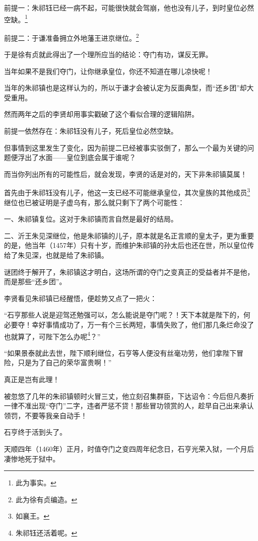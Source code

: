 \begin{multicols}{\theparacolNo}
		前提一：朱祁钰已经一病不起，可能很快就会驾崩，他也没有儿子，到时皇位必然空缺。\footnote{此为事实。}

		前提二：于谦准备拥立外地藩王进京继位。\footnote{此为徐有贞编造。}

		于是徐有贞就此得出了一个理所应当的结论：夺门有功，谋反无罪。

		当年如果不是我们夺门，让你继承皇位，你还不知道在哪儿凉快呢！

		当年的朱祁镇也是这样认为的，所以于谦才会被认定为反面典型，而“还乡团”却大受重用。

		然而两年之后的李贤却用事实戳破了这个看似合理的逻辑陷阱。

		前提一依然存在：朱祁钰没有儿子，死后皇位必然空缺。

		但事情到这里发生了变化，因为前提二已经被事实驳倒了，那么一个最为关键的问题便浮出了水面——皇位到底会属于谁呢？

		而当你列出所有的可能性后，就会发现，李贤的话是对的，天下非朱祁镇莫属！

		首先由于朱祁钰没有儿子，他这一支已经不可能继承皇位，其次皇族的其他成员\footnote{如襄王。}继位也已被证明是子虚乌有，那么就只剩下了两个可能性：

		一、朱祁镇复位。这对于朱祁镇而言自然是最好的结局。

		二、沂王朱见深继位，他是朱祁镇的儿子，原本就是名正言顺的皇太子，更为重要的是，他当年（1457年）只有十岁，而维护朱祁镇的孙太后也还在世，所以皇位传给了朱见深，也就是给了朱祁镇。

		谜团终于解开了，朱祁镇这才明白，这场所谓的夺门之变真正的受益者并不是他，而是那些“还乡团”。

		李贤看见朱祁镇已经醒悟，便趁势又点了一把火：

		“石亨那些人说是迎驾还勉强可以，怎么能说是夺门呢？！天下本就是陛下的，何必要夺！幸好事情成功了，万一有个三长两短，事情失败了，他们那几条烂命没了也就算了，可陛下怎么办呢\footnote{朱祁钰还活着呢。}？”

		“如果景泰就此去世，陛下顺利继位，石亨等人便没有丝毫功劳，他们拿陛下冒险，只是为了自己的荣华富贵啊！”

		真正是岂有此理！

		被忽悠了几年的朱祁镇顿时火冒三丈，他立刻召集群臣，下达诏令：今后但凡奏折一律不准出现“夺门”二字，违者严惩不贷！那些冒功领赏的人，趁早自己出来承认领罚，不要等我亲自动手！

		石亨终于活到头了。

		天顺四年（1460年）正月，时值夺门之变四周年纪念日，石亨光荣入狱，一个月后凄惨地死于狱中。


\end{multicols}
